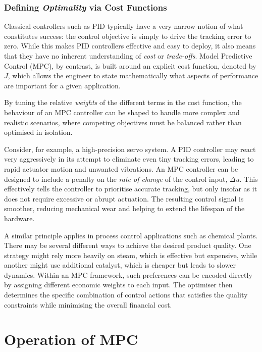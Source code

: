 \subsubsection{Defining \emph{Optimality} via Cost Functions}

Classical controllers such as PID typically have a very narrow notion of what constitutes success: the control objective is simply to drive the tracking error to zero. While this makes PID controllers effective and easy to deploy, it also means that they have no inherent understanding of \emph{cost} or \emph{trade-offs}. Model Predictive Control (MPC), by contrast, is built around an explicit cost function, denoted by \(J\), which allows the engineer to state mathematically what aspects of performance are important for a given application.

By tuning the relative \emph{weights} of the different terms in the cost function, the behaviour of an MPC controller can be shaped to handle more complex and realistic scenarios, where competing objectives must be balanced rather than optimised in isolation.

Consider, for example, a high-precision servo system. A PID controller may react very aggressively in its attempt to eliminate even tiny tracking errors, leading to rapid actuator motion and unwanted vibrations. An MPC controller can be designed to include a penalty on the \emph{rate of change} of the control input, \(\Delta u\). This effectively tells the controller to prioritise accurate tracking, but only insofar as it does not require excessive or abrupt actuation. The resulting control signal is smoother, reducing mechanical wear and helping to extend the lifespan of the hardware.

A similar principle applies in process control applications such as chemical plants. There may be several different ways to achieve the desired product quality. One strategy might rely more heavily on steam, which is effective but expensive, while another might use additional catalyst, which is cheaper but leads to slower dynamics. Within an MPC framework, such preferences can be encoded directly by assigning different economic weights to each input. The optimiser then determines the specific combination of control actions that satisfies the quality constraints while minimising the overall financial cost.



\section{Operation of MPC}

